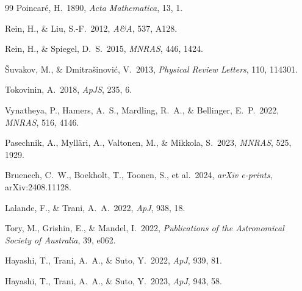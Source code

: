 \documentclass[12pt,a4paper]{article}
\begin{document}
\begin{thebibliography}{99}
Poincar\'e, H.\ 1890,
\textit{Acta Mathematica}, 13, 1.

Rein, H., \& Liu, S.-F.\ 2012,
\textit{A\&A}, 537, A128.

Rein, H., \& Spiegel, D.~S.\ 2015,
\textit{MNRAS}, 446, 1424.

\v{S}uvakov, M., \& Dmitra\v{s}inovi\'c, V.\ 2013,
\textit{Physical Review Letters}, 110, 114301.

Tokovinin, A.\ 2018,
\textit{ApJS}, 235, 6.

Vynatheya, P., Hamers, A.~S., Mardling, R.~A., \& Bellinger, E.~P.\ 2022,
\textit{MNRAS}, 516, 4146.

Pasechnik, A., Myll\"ari, A., Valtonen, M., \& Mikkola, S.\ 2023,
\textit{MNRAS}, 525, 1929.

Bruenech, C.~W., Boekholt, T., Toonen, S., et al.\ 2024,
\textit{arXiv e-prints}, arXiv:2408.11128.

Lalande, F., \& Trani, A.~A.\ 2022,
\textit{ApJ}, 938, 18.

Tory, M., Grishin, E., \& Mandel, I.\ 2022,
\textit{Publications of the Astronomical Society of Australia}, 39, e062.

Hayashi, T., Trani, A.~A., \& Suto, Y.\ 2022,
\textit{ApJ}, 939, 81.

Hayashi, T., Trani, A.~A., \& Suto, Y.\ 2023,
\textit{ApJ}, 943, 58.

\end{thebibliography}
\end{document}
